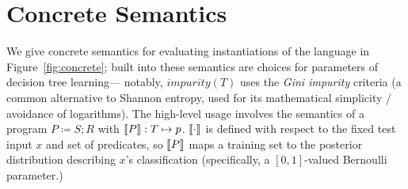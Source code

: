 \section{Concrete Semantics}

We give concrete semantics for evaluating instantiations of the language
in Figure~\ref{fig:concrete};
built into these semantics are choices for parameters of decision tree learning---%
notably, $\mathit{impurity(T)}$ uses the \emph{Gini impurity} criteria
(a common alternative to Shannon entropy, used for its mathematical simplicity
/ avoidance of logarithms).
The high-level usage involves the semantics of a program $P \coloneqq S ; R$
with $\llbracket {P} \rrbracket : T \mapsto p$.
$\llbracket {\cdot} \rrbracket$ is defined with respect to the fixed test input $x$ and set of predicates,
so $\llbracket {P} \rrbracket$ maps a training set to the posterior distribution describing $x$'s classification
(specifically, a $[0,1]$-valued Bernoulli parameter.)


